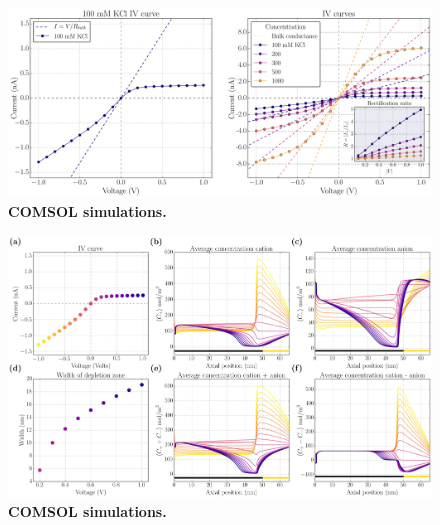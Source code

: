 		\begin{figure}
			\includegraphics[width=\textwidth]{comsol1}
			\caption{\textbf{COMSOL simulations.}}
			\label{fig:comsol1}
		\end{figure}
		
		\begin{figure}
			\includegraphics[width=\textwidth]{comsol2}
			\caption{\textbf{COMSOL simulations.}}
			\label{fig:comsol2}
		\end{figure}
		
